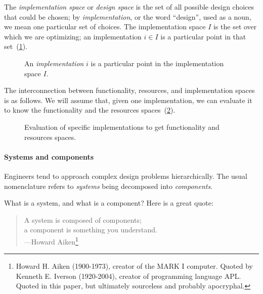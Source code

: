 The \emph{implementation space} or \textit{design space} is the set of all possible design choices that could be chosen;
by \textit{implementation}, or the word ``design'', used as a noun, we mean one particular  set of choices. The implementation space $I$ is the set over which we are optimizing; an implementation $i\in I$ is a particular point in that set~(\cref{fig:impspace}).

\begin{figure}[h!]
    \begin{center}
    \end{center}
    \caption{An \emph{implementation} $i$ is a particular point in the implementation space $I$.}
    \label{fig:impspace}
\end{figure}


The interconnection between functionality, resources, and implementation spaces
is as follows. We will assume that, given one implementation, we can evaluate it
to know the functionality and the resources spaces~(\cref{fig:FIR}).

\begin{figure}[h!]
    \centering
    \caption{Evaluation of specific implementations to get functionality and resources spaces.\label{fig:FIR}}
\end{figure}

\paragraph{Systems and components}

Engineers tend to approach complex design problems hierarchically.  The usual
nomenclature refers to \textit{systems} being decomposed into \textit{components}.

\noindent What is a system, and what is a component? Here is a great quote:

\begin{quote}
A system is composed of components; \\
a component is something you understand.\\
---Howard Aiken\footnote{
Howard H. Aiken (1900-1973), creator of the MARK I computer.
Quoted by Kenneth E. Iverson (1920-2004), creator of programming language APL.
Quoted in this paper\cite{that-paper},
  but ultimately sourceless and probably apocryphal.}
\end{quote}

